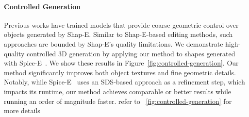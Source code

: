 \vspace{-14pt}
\paragraph{Controlled Generation}
Previous works have trained models that provide coarse geometric control over objects generated by Shap-E. Similar to Shap-E-based editing methods, such approaches are bounded by Shap-E's quality limitations. We demonstrate high-quality controlled 3D generation by applying our method to shapes generated with Spice-E~\cite{sella2024spicee}.
We show these results in Figure~\ref{fig:controlled-generation}. Our method significantly improves both object textures and fine geometric details. Notably, while Spice-E~\cite{sella2024spicee} uses an SDS-based approach as a refinement step, which impacts its runtime, our method achieves comparable or better results while running an order of magnitude faster. refer to ~\ref{fig:controlled-generation} for more details

% 


\vspace{-3pt}   